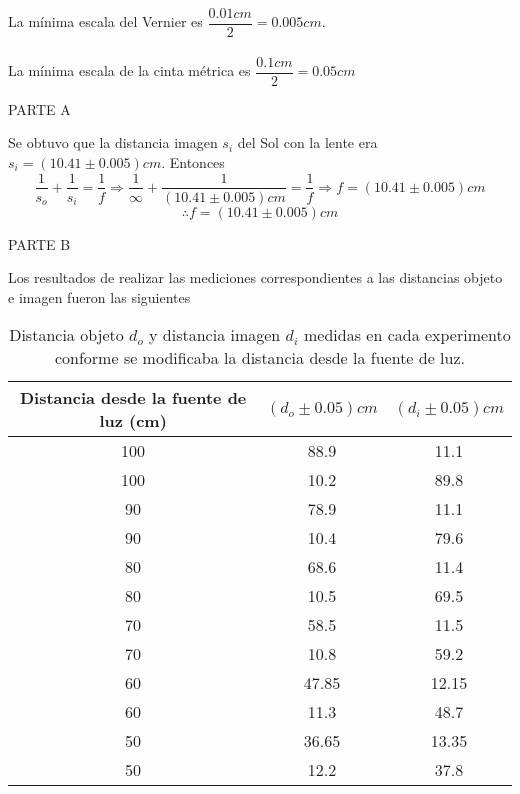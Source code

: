 \documentclass[a4paper, 10pt]{article}
\begin{document}
	
	La mínima escala del Vernier es $\dfrac{0.01 cm}{2}=0.005 cm$.\\\\
	La mínima escala de la cinta métrica es $\dfrac{0.1 cm}{2}=0.05 cm$
	
	PARTE A
	
	Se obtuvo que la distancia imagen $s_i$ del Sol con la lente era $s_i=(10.41\pm0.005)cm$. Entonces
	$$\dfrac{1}{s_o}+\dfrac{1}{s_i}=\dfrac{1}{f}\Longrightarrow\dfrac{1}{\infty}+\dfrac{1}{(10.41\pm0.005) cm}=\dfrac{1}{f}\Longrightarrow f=(10.41\pm0.005) cm$$
	$$\therefore f=(10.41\pm0.005) cm$$
	
	PARTE B
	
	Los resultados de realizar las mediciones correspondientes a las distancias objeto e imagen fueron las siguientes

	\begin{table}[ht]
		\centering
		\caption{Distancia objeto $d_o$ y distancia imagen $d_i$ medidas en cada experimento conforme se modificaba la distancia desde la fuente de luz.}	
		\begin{tabular}{|c|c|c|}
			\hline
			Distancia desde la fuente de luz (cm) & $ (d_o \pm 0.05) cm$ & $(d_i \pm 0.05)cm$ \\
			\hline
			100 & 88.9 & 11.1 \\
			\hline
			100 & 10.2 & 89.8 \\
			\hline
			90 & 78.9 & 11.1 \\
			\hline
			90 & 10.4 & 79.6 \\
			\hline
			80 & 68.6 & 11.4 \\
			\hline
			80 & 10.5 & 69.5 \\
			\hline
			70 & 58.5 & 11.5 \\
			\hline
			70 & 10.8 & 59.2 \\
			\hline
			60 & 47.85 & 12.15 \\
			\hline
			60 & 11.3 & 48.7 \\
			\hline
			50 & 36.65 & 13.35 \\
			\hline
			50 & 12.2 & 37.8 \\
			\hline
		\end{tabular}
	\label{tab:exp2}
	\end{table}
\end{document}

